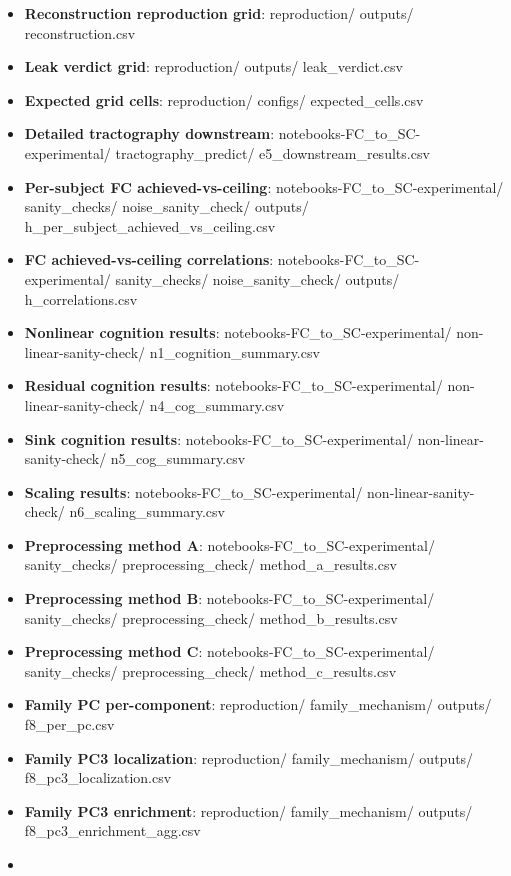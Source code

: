 \begin{itemize}
\item
  \textbf{Reconstruction reproduction grid}: reproduction/ outputs/ reconstruction.csv
\item
  \textbf{Leak verdict grid}: reproduction/ outputs/ leak\_verdict.csv
\item
  \textbf{Expected grid cells}: reproduction/ configs/ expected\_cells.csv
\item
  \textbf{Detailed tractography downstream}: notebooks-FC\_to\_SC-experimental/ tractography\_predict/ e5\_downstream\_results.csv
\item
  \textbf{Per-subject FC achieved-vs-ceiling}: notebooks-FC\_to\_SC-experimental/ sanity\_checks/ noise\_sanity\_check/ outputs/ h\_per\_subject\_achieved\_vs\_ceiling.csv
\item
  \textbf{FC achieved-vs-ceiling correlations}: notebooks-FC\_to\_SC-experimental/ sanity\_checks/ noise\_sanity\_check/ outputs/ h\_correlations.csv
\item
  \textbf{Nonlinear cognition results}: notebooks-FC\_to\_SC-experimental/ non-linear-sanity-check/ n1\_cognition\_summary.csv
\item
  \textbf{Residual cognition results}: notebooks-FC\_to\_SC-experimental/ non-linear-sanity-check/ n4\_cog\_summary.csv
\item
  \textbf{Sink cognition results}: notebooks-FC\_to\_SC-experimental/ non-linear-sanity-check/ n5\_cog\_summary.csv
\item
  \textbf{Scaling results}: notebooks-FC\_to\_SC-experimental/ non-linear-sanity-check/ n6\_scaling\_summary.csv
\item
  \textbf{Preprocessing method A}: notebooks-FC\_to\_SC-experimental/ sanity\_checks/ preprocessing\_check/ method\_a\_results.csv
\item
  \textbf{Preprocessing method B}: notebooks-FC\_to\_SC-experimental/ sanity\_checks/ preprocessing\_check/ method\_b\_results.csv
\item
  \textbf{Preprocessing method C}: notebooks-FC\_to\_SC-experimental/ sanity\_checks/ preprocessing\_check/ method\_c\_results.csv
\item
  \textbf{Family PC per-component}: reproduction/ family\_mechanism/ outputs/ f8\_per\_pc.csv
\item
  \textbf{Family PC3 localization}: reproduction/ family\_mechanism/ outputs/ f8\_pc3\_localization.csv
\item
  \textbf{Family PC3 enrichment}: reproduction/ family\_mechanism/ outputs/ f8\_pc3\_enrichment\_agg.csv
\item

\end{itemize}
